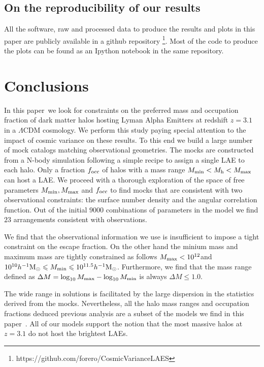 \documentclass[usenatbib]{mn2e}
\newcommand{\documentname}{paper~}
\newcommand{\hMsun}{{\ifmmode{h^{-1}{\rm
        {M_{\odot}}}}\else{$h^{-1}{\rm{M_{\odot}}}$}\fi}}
\begin{document}
\subsection{On the reproducibility of our results}

All the software, raw and processed data to produce the results
and plots in this paper are publicly available in a github
repository \footnote{https://github.com/forero/CosmicVarianceLAES}. Most
of the code to produce the plots can be found as an Ipython notebook
\citep{IPython} in the same repository.



\section{Conclusions}
\label{sec:conclusions}

In this \documentname we look for constraints on the preferred mass
and occupation fraction of dark matter halos hosting Lyman Alpha Emitters at
redshift $z=3.1$ in a $\Lambda$CDM cosmology. We perform this study
paying special attention to the impact of cosmic variance on these
results. To this end we build a large number of mock catalogs matching
observational geometries. The mocks are constructed from a N-body simulation
following a simple recipe to assign a single LAE to each halo. Only
a fraction $f_{\rm occ}$ of halos with a mass range  $M_{\rm
  min}<M_{\rm h}<M_{\rm   max}$ can host a LAE. We proceed with a
thorough exploration of the space of free parameters $M_{\rm min},
M_{\rm max}$ and $f_{\rm occ}$ to find mocks that are consistent with
two observational constraints: the surface number density and the
angular correlation function. Out of the initial $9000$ 
combinations of parameters in the model we find $23$ arrangements
consistent with observations.

We find that the observational information we use is insufficient to
impose a tight constraint on the escape fraction. On the other hand
the minium mass and maximum mass are tightly constrained as follows
$M_{\rm max}<10^{12}$\hMsun and $10^{10}\hMsun\leq M_{\rm min}\leq
10^{11.5}\hMsun$. Furthermore, we find that the mass range defined as
$\Delta M=\log_{10}M_{\rm max} - \log_{10}M_{\rm min}$ is always
$\Delta M\leq 1.0$.

The wide range in solutions is facilitated by the large dispersion in
the statistics derived from the mocks. Nevertheless, all the halo mass
ranges and occupation fractions deduced previous analysis
\citep[i.e.][]{Gawiser2007,Ouchi2010} are a subset of the models we
find in this \documentname. All of our models support the notion that
the most massive halos at $z=3.1$ do not host the brightest LAEs.
\end{document}
